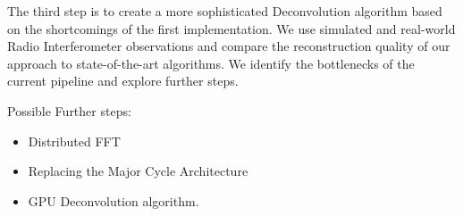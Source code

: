 The third step is to create a more sophisticated Deconvolution algorithm based on the shortcomings of the first implementation. We use simulated and real-world Radio Interferometer observations and compare the reconstruction quality of our approach to state-of-the-art algorithms. We identify the bottlenecks of the current pipeline and explore further steps.

Possible Further steps:
\begin{itemize}
	\item Distributed FFT
	\item Replacing the Major Cycle Architecture
	\item GPU Deconvolution algorithm.
\end{itemize}





